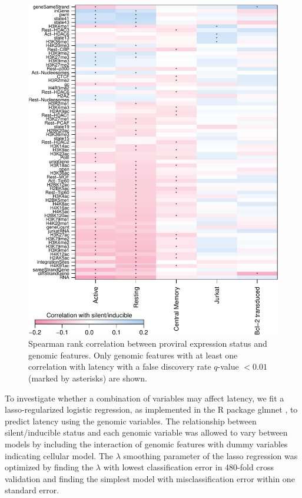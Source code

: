 \documentclass[../sherrill-Mix_thesis.tex]{subfiles}
\begin{document}
	\begin{figure}
		\centering
			\includegraphics[width=\textwidth]{variableCorrelationDerep.pdf} %
		\caption[Correlations of genomic features and latency]{Spearman rank correlation between proviral expression status and genomic features. Only genomic features with at least one correlation with latency with a false discovery rate $q$-value $<0.01$ (marked by asterisks) are shown.}
		\label{figCor}
	\end{figure}

		To investigate whether a combination of variables may affect latency, we fit a lasso-regularized logistic regression, as implemented in the R package glmnet \citep{Friedman2010}, to predict latency using the genomic variables. The relationship between silent/inducible status and each genomic variable was allowed to vary between models by including the interaction of genomic features with dummy variables indicating cellular model. The $\lambda$ smoothing parameter of the lasso regression was optimized by finding the $\lambda$ with lowest classification error in 480-fold cross validation and finding the simplest model with misclassification error within one standard error.
\end{document}
